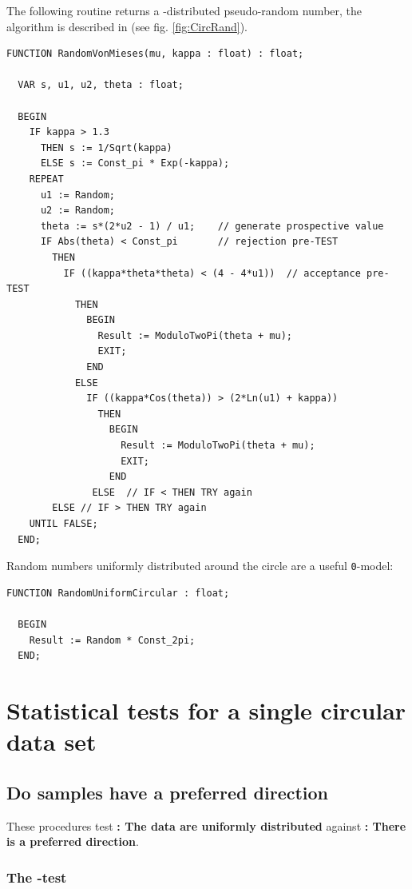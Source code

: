\begin{refsection}
The following routine returns a -distributed pseudo-random number, the algorithm is described in \parencite{Bar-95} (see fig. \ref{fig:CircRand}).

\begin{lstlisting}[caption=von Mieses distributed random number]
  FUNCTION RandomVonMieses(mu, kappa : float) : float;

  VAR s, u1, u2, theta : float;

  BEGIN
    IF kappa > 1.3
      THEN s := 1/Sqrt(kappa)
      ELSE s := Const_pi * Exp(-kappa);
    REPEAT
      u1 := Random;
      u2 := Random;
      theta := s*(2*u2 - 1) / u1;    // generate prospective value
      IF Abs(theta) < Const_pi       // rejection pre-TEST
        THEN
          IF ((kappa*theta*theta) < (4 - 4*u1))  // acceptance pre-TEST
            THEN
              BEGIN
                Result := ModuloTwoPi(theta + mu);
                EXIT;
              END
            ELSE
              IF ((kappa*Cos(theta)) > (2*Ln(u1) + kappa))
                THEN
                  BEGIN
                    Result := ModuloTwoPi(theta + mu);
                    EXIT;
                  END
               ELSE  // IF < THEN TRY again
        ELSE // IF > THEN TRY again
    UNTIL FALSE;
  END;
\end{lstlisting}

Random numbers uniformly distributed around the circle are a useful \texttt{0}-model:

\begin{lstlisting}[caption=Random data uniformly distributed over a circle]
  FUNCTION RandomUniformCircular : float;

  BEGIN
    Result := Random * Const_2pi;
  END;
\end{lstlisting}

\section{Statistical tests for a single circular data set}

\subsection{Do samples have a preferred direction}

These procedures test \textbf{: The data are uniformly distributed} against \textbf{: There is a preferred direction}.

\subsubsection{The -test}


\end{refsection}
